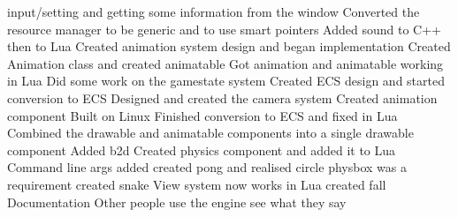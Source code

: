 \documentclass[11pt,a4paper,titlepage]{article}
\begin{document}
input/setting and getting some information from the window
Converted the resource manager to be generic and to use smart pointers
Added sound to C++ then to Lua
Created animation system design and began implementation
Created Animation class and created animatable
Got animation and animatable working in Lua
Did some work on the gamestate system
Created ECS design and started conversion to ECS	
Designed and created the camera system
Created animation component
Built on Linux
Finished conversion to ECS and fixed in Lua
Combined the drawable and animatable components into a single drawable component
Added b2d
Created physics component and added it to Lua
Command line args added
created pong and realised circle physbox was a requirement
created snake
View system now works in Lua
created fall
Documentation
Other people use the engine
see what they say
    
    \printbibliography{}
\end{document}
